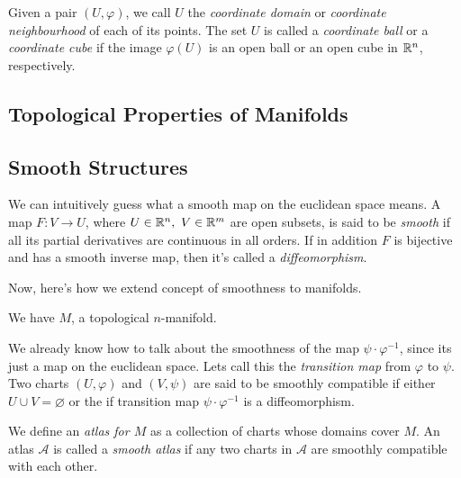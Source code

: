 Given a pair $(U,\varphi)$, we call $U$ the \emph{coordinate domain} or \emph{coordinate neighbourhood} of each of its points. The set $U$ is called a \emph{coordinate ball} or a \emph{coordinate cube} if the image $\varphi(U)$ is an open ball or an open cube in $\mathbb{R}^n$, respectively.

\subsection{Topological Properties of Manifolds}
\label{sub:topological_properties_of_manifolds}

\subsection{Smooth Structures}
\label{sub:smooth_structures}
We can intuitively guess what a smooth map on the euclidean space means.
A map $F: V\to U$, where $U\in \mathbb{R}^n,\ V\in \mathbb{R}^m$ are open subsets, is said to be \emph{smooth} if all its partial derivatives are continuous in all orders. If in addition $F$ is bijective and has a smooth inverse map, then it's called a \emph{diffeomorphism}.

Now, here's how we extend concept of smoothness to manifolds.

We have $M$, a topological $n$-manifold. 
\begin{center}
\end{center}
We already know how to talk about the smoothness of the map $\psi\cdot\varphi^{-1}$, since its just a map on the euclidean space. Lets call this the \emph{transition map} from $\varphi$ to $\psi$. Two charts $(U,\varphi)$ and $(V,\psi)$ are said to be smoothly compatible if either $U \cup V =\varnothing$ or the if transition map $\psi\cdot\varphi^{-1}$ is a diffeomorphism.

We define an \emph{atlas for $M$} as a collection of charts whose domains cover $M$. An atlas $\mathcal A$ is called a \emph{smooth atlas} if any two charts in $\mathcal A$ are smoothly compatible with each other.

